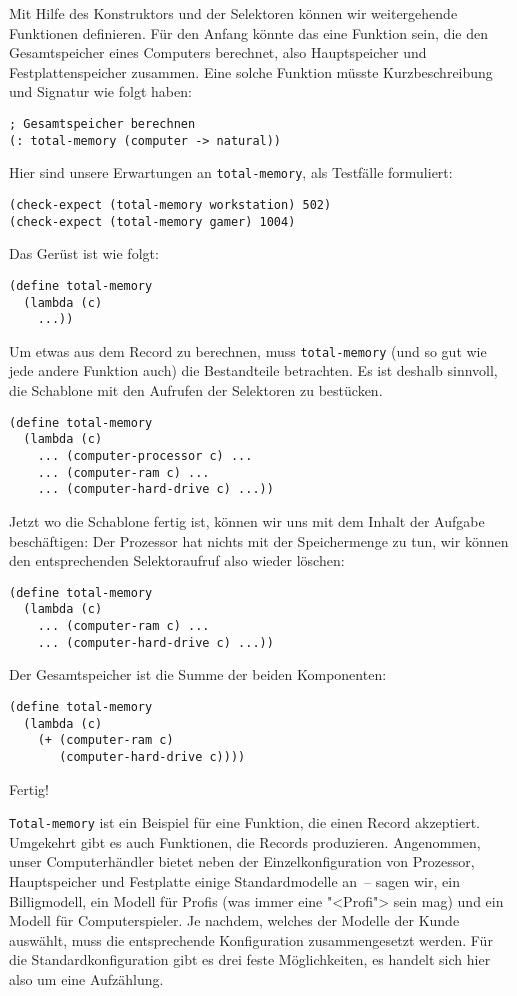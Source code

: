 Mit Hilfe des Konstruktors und der Selektoren können wir weitergehende
Funktionen definieren.
Für den Anfang könnte das
eine Funktion sein, die den Gesamtspeicher eines Computers berechnet,
also Hauptspeicher und Festplattenspeicher zusammen.
Eine solche Funktion müsste Kurzbeschreibung und Signatur wie folgt
haben: 
%
\begin{lstlisting}
; Gesamtspeicher berechnen
(: total-memory (computer -> natural))
\end{lstlisting}
%
Hier sind unsere Erwartungen an \lstinline{total-memory}, als Testfälle
formuliert:
%
\begin{lstlisting}
(check-expect (total-memory workstation) 502)
(check-expect (total-memory gamer) 1004)
\end{lstlisting}
% 
Das Gerüst ist wie folgt:
%
\begin{lstlisting}
(define total-memory
  (lambda (c)
    ...))
\end{lstlisting}
%
Um etwas aus dem Record zu berechnen, muss \lstinline{total-memory} (und
so gut wie jede andere Funktion auch) die Bestandteile betrachten.  Es
ist deshalb sinnvoll, die Schablone mit den Aufrufen der Selektoren zu
bestücken.
%
\begin{lstlisting}
(define total-memory
  (lambda (c)
    ... (computer-processor c) ...
    ... (computer-ram c) ...
    ... (computer-hard-drive c) ...))
\end{lstlisting}
%
Jetzt wo die Schablone fertig ist, können wir uns mit dem Inhalt der
Aufgabe beschäftigen: Der Prozessor hat nichts mit der
Speichermenge zu tun, wir können den entsprechenden Selektoraufruf
also wieder löschen:
%
\begin{lstlisting}
(define total-memory
  (lambda (c)
    ... (computer-ram c) ...
    ... (computer-hard-drive c) ...))
\end{lstlisting}
%
Der Gesamtspeicher ist die Summe der beiden Komponenten:
%
\begin{lstlisting}
(define total-memory
  (lambda (c)
    (+ (computer-ram c)
       (computer-hard-drive c))))
\end{lstlisting}
%
Fertig!

\lstinline{Total-memory} ist ein Beispiel für eine Funktion, die einen
Record akzeptiert.  Umgekehrt gibt es auch Funktionen, die Records
produzieren.  Angenommen, unser Computerhändler bietet neben der
Einzelkonfiguration von Prozessor, Hauptspeicher und Festplatte einige
Standardmodelle an~-- sagen wir, ein Billigmodell, ein Modell für
Profis (was immer eine "<Profi"> sein mag) und ein Modell für
Computerspieler.  Je nachdem, welches der Modelle der Kunde auswählt,
muss die entsprechende Konfiguration zusammengesetzt werden.  Für die
Standardkonfiguration gibt es drei feste Möglichkeiten, es handelt
sich hier also um eine Aufzählung.

